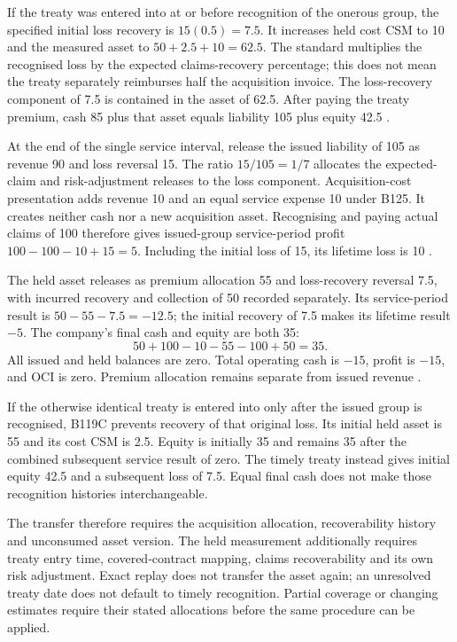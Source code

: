 If the treaty was entered into at or before recognition of the onerous group,
the specified initial loss recovery is $15(0.5)=7.5$. It increases held
cost CSM to 10 and the measured asset to $50+2.5+10=62.5$.
The standard multiplies the recognised loss by the expected claims-recovery
percentage; this does not mean the treaty separately reimburses half the
acquisition invoice. The loss-recovery component of 7.5 is contained in the
asset of 62.5. After paying the treaty premium, cash 85 plus that asset equals
liability 105 plus equity 42.5
\citep[paragraphs 66A--66B and B119C--B119F]{aasb17}.

At the end of the single service interval, release the issued liability of
105 as revenue 90 and loss reversal 15. The ratio $15/105=1/7$ allocates
the expected-claim and risk-adjustment releases to the loss component.
Acquisition-cost presentation adds revenue 10 and an equal service expense
10 under B125. It creates neither cash nor a new acquisition asset.
Recognising and paying actual claims of 100 therefore gives issued-group
service-period profit $100-100-10+15=5$. Including the initial loss of
15, its lifetime loss is 10
\citep[paragraphs 49--52 and B120--B125]{aasb17}.

The held asset releases as premium allocation 55 and loss-recovery reversal
7.5, with incurred recovery and collection of 50 recorded separately.
Its service-period result is $50-55-7.5=-12.5$; the initial recovery
of 7.5 makes its lifetime result $-5$. The company's final cash and equity
are both 35:
\[
 50+100-10-55-100+50=35.
\]
All issued and held balances are zero. Total operating cash is $-15$,
profit is $-15$, and OCI is zero. Premium allocation remains separate from
issued revenue \citep[paragraph 86]{aasb17}.

If the otherwise identical treaty is entered into only after the issued
group is recognised, B119C prevents recovery of that original loss.
Its initial held asset is 55 and its cost CSM is 2.5. Equity is initially
35 and remains 35 after the combined subsequent service result of zero.
The timely treaty instead gives initial equity 42.5 and a subsequent loss
of 7.5. Equal final cash does not make those recognition histories
interchangeable.

The transfer therefore requires the acquisition allocation, recoverability
history and unconsumed asset version. The held measurement additionally
requires treaty entry time, covered-contract mapping, claims recoverability
and its own risk adjustment. Exact replay does not transfer the asset again;
an unresolved treaty date does not default to timely recognition. Partial
coverage or changing estimates require their stated allocations before the
same procedure can be applied.

